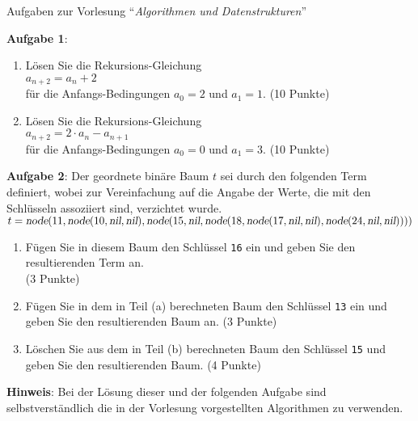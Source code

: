 \documentclass{article}
\begin{document}
\noindent
{\large Aufgaben zur Vorlesung  ``{\sl Algorithmen und Datenstrukturen}''}
\vspace{0.5cm}


\noindent
\textbf{Aufgabe 1}:
\begin{enumerate}
\item L\"osen Sie die Rekursions-Gleichung \\[0.2cm]
      \hspace*{1.3cm} $a_{n+2} = a_n + 2$ \\[0.2cm]
      f\"ur die Anfangs-Bedingungen $a_0 = 2$ und $a_1 = 1$.
      \hspace*{\fill} (10 Punkte)
\item L\"osen Sie die Rekursions-Gleichung \\[0.2cm]
      \hspace*{1.3cm} $a_{n+2} = 2 \cdot a_n - a_{n+1}$ \\[0.2cm]
      f\"ur die Anfangs-Bedingungen $a_0 = 0$ und $a_1 = 3$.
      \hspace*{\fill} (10 Punkte)
\end{enumerate}
\vspace{0.3cm}

\noindent
\textbf{Aufgabe 2}:
Der geordnete bin\"are Baum $t$ sei durch den folgenden Term definiert,
wobei zur Vereinfachung auf die Angabe der Werte, die mit den Schl\"usseln
assoziiert sind, verzichtet wurde.
\\[0.2cm]
\hspace*{1.3cm}
$t = \textsl{node}(11, \textsl{node}(10, \textsl{nil}, \textsl{nil}), \textsl{node}(15, \textsl{nil}, 
  \textsl{node}(18, \textsl{node}(17, \textsl{nil}, \textsl{nil}), 
  \textsl{node}(24, \textsl{nil}, \textsl{nil}))))
$
\begin{enumerate}
\item F\"ugen Sie in diesem Baum den Schl\"ussel \texttt{16} ein und geben Sie den
      resultierenden Term an.  \\ 
      \hspace*{\fill} (3 Punkte)
\item F\"ugen Sie in dem in Teil (a) berechneten Baum den Schl\"ussel \texttt{13} ein und
      geben Sie den resultierenden Baum an.     
      \hspace*{\fill} (3 Punkte)
\item L\"oschen Sie aus dem in Teil (b) berechneten Baum den Schl\"ussel \texttt{15} und
      geben Sie den resultierenden Baum. 
      \hspace*{\fill} (4 Punkte)
\end{enumerate}
\textbf{Hinweis}: Bei der L\"osung dieser und der folgenden Aufgabe sind selbstverst\"andlich
die in der Vorlesung vorgestellten Algorithmen zu verwenden.
\vspace{0.2cm}
\end{document}
